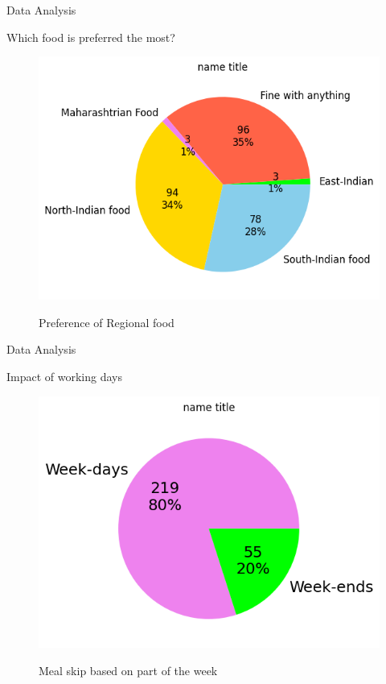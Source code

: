 \documentclass{beamer}
\begin{document}
\begin{frame}{Data Analysis}
\begin{block}{Which food is preferred the most?}
\begin{figure}
      \centering
    \caption{ Preference of Regional food}
    \includegraphics[scale = 0.55]{pie_food_pref.png}  
    \label{pie_food_pref}
\end{figure}
\end{block}
\end{frame}
\begin{frame}{Data Analysis}
\begin{block}{Impact of working days}
\begin{figure}
      \centering
    \caption{Meal skip based on part of the week }
    \includegraphics[scale = 0.55]{pie_plot_weekdays.png}  
    \label{pie_weekdays}
\end{figure}
\end{block}
\end{frame}
\end{document}
